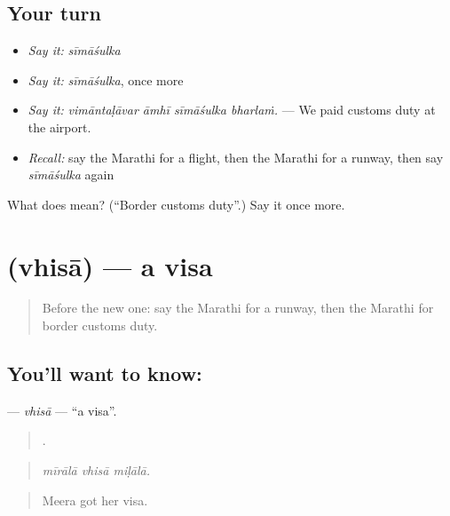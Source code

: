 \subsection*{Your turn}
\begin{itemize}
\raggedright
  \item \emph{Say it:} \emph{sīmāśulka}
  \item \emph{Say it:} \emph{sīmāśulka}, once more
  \item \emph{Say it:} \emph{vimāntaḷāvar āmhī sīmāśulka bharlaṁ.} — We paid customs duty at the airport.
  \item \emph{Recall:} say the Marathi for a flight, then the Marathi for a runway, then say \emph{sīmāśulka} again
\end{itemize}

\begin{tcolorbox}[breakable,colback=teal!4,colframe=teal!35!black,title={Before you move on}]
What does  mean? (\textquotedblleft{}Border customs duty\textquotedblright{}.) Say it once more.
\end{tcolorbox}
\section[\texorpdfstring{\mr{व्हिसा} (vhisā)}{व्हिसा (vhisā)}]{ (vhisā) — a visa}

\label{lesson:MR-C405-vhisa}



\begin{quote}
Before the new one: say the Marathi for a runway, then the Marathi for border customs duty.
\end{quote}

\subsection*{You'll want to know: }
\textbf{} — \emph{vhisā} — \textquotedblleft{}a visa\textquotedblright{}.

\begin{quote}
  .
\end{quote}

\begin{quote}
\emph{mīrālā vhisā miḷālā.}
\end{quote}

\begin{quote}
Meera got her visa.
\end{quote}

